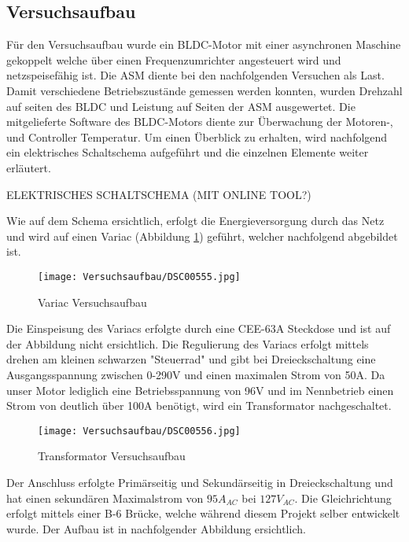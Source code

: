 \subsection{Versuchsaufbau}\label{subsec:Versuchsaufbau}
Für den Versuchsaufbau wurde ein BLDC-Motor mit einer asynchronen Maschine gekoppelt welche über einen Frequenzumrichter angesteuert wird und netzspeisefähig ist. Die ASM diente bei den nachfolgenden Versuchen als Last. Damit verschiedene Betriebszustände gemessen werden konnten, wurden Drehzahl auf seiten des BLDC und Leistung auf Seiten der ASM ausgewertet. Die mitgelieferte Software des BLDC-Motors diente zur Überwachung der Motoren-, und Controller Temperatur. Um einen Überblick zu erhalten, wird nachfolgend ein elektrisches Schaltschema aufgeführt und die einzelnen Elemente weiter erläutert.


ELEKTRISCHES SCHALTSCHEMA (MIT ONLINE TOOL?)



Wie auf dem Schema ersichtlich, erfolgt die Energieversorgung durch das Netz und wird auf einen Variac (Abbildung \ref{fig:Variac}) geführt, welcher nachfolgend abgebildet ist.

\begin{figure}[H]
	\begin{center}
		\texttt{[image: Versuchsaufbau/DSC00555.jpg]}
		\caption[Variac Versuchsaufbau]{Variac Versuchsaufbau}
		\label{fig:Variac}
	\end{center}
\end{figure}

Die Einspeisung des Variacs erfolgte durch eine CEE-63A Steckdose und ist auf der Abbildung nicht ersichtlich. Die Regulierung des Variacs erfolgt mittels drehen am kleinen schwarzen "Steuerrad" und gibt bei Dreieckschaltung eine Ausgangsspannung zwischen 0-290V und einen maximalen Strom von 50A. Da unser Motor lediglich eine Betriebsspannung von 96V und im Nennbetrieb einen Strom von deutlich über 100A benötigt, wird ein Transformator nachgeschaltet. 

\begin{figure}[H]
	\begin{center}
		\texttt{[image: Versuchsaufbau/DSC00556.jpg]}
		\caption[Transformator Versuchsaufbau]{Transformator Versuchsaufbau}
		\label{fig:Trafo}
	\end{center}
\end{figure}

Der Anschluss erfolgte Primärseitig und Sekundärseitig in Dreieckschaltung und hat einen sekundären Maximalstrom von $95A_{AC}$ bei $127V_{AC}$. Die Gleichrichtung erfolgt mittels einer B-6 Brücke, welche während diesem Projekt selber entwickelt wurde. Der Aufbau ist in nachfolgender Abbildung ersichtlich.

